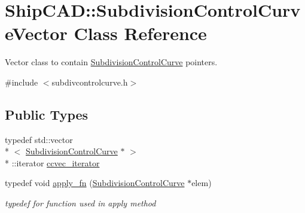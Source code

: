 \hypertarget{classShipCAD_1_1SubdivisionControlCurveVector}{\section{Ship\-C\-A\-D\-:\-:Subdivision\-Control\-Curve\-Vector Class Reference}
\label{classShipCAD_1_1SubdivisionControlCurveVector}
}


Vector class to contain \hyperlink{classShipCAD_1_1SubdivisionControlCurve}{Subdivision\-Control\-Curve} pointers.  




{\ttfamily \#include $<$subdivcontrolcurve.\-h$>$}

\subsection*{Public Types}
\begin{DoxyCompactItemize}
\item 
typedef std\-::vector\\*
$<$ \hyperlink{classShipCAD_1_1SubdivisionControlCurve}{Subdivision\-Control\-Curve} $\ast$ $>$\\*
\-::iterator \hyperlink{classShipCAD_1_1SubdivisionControlCurveVector_a33907b10974aed115e0217c836424762}{ccvec\-\_\-iterator}
\item 
typedef void \hyperlink{classShipCAD_1_1SubdivisionControlCurveVector_a141aff5158a297112fec989165732299}{apply\-\_\-fn} (\hyperlink{classShipCAD_1_1SubdivisionControlCurve}{Subdivision\-Control\-Curve} $\ast$elem)
\begin{DoxyCompactList}\small\item\em typedef for function used in apply method \end{DoxyCompactList}\end{DoxyCompactItemize}
